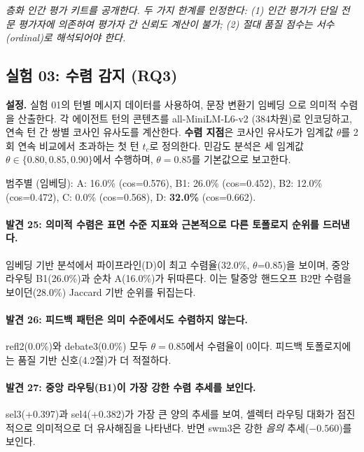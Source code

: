 \documentclass[a4paper,11pt]{article}
\begin{document}
\emph{층화 인간 평가 키트를 공개한다. 두 가지 한계를 인정한다: (1) 인간 평가가 단일 전문 평가자에 의존하여 평가자 간 신뢰도 계산이 불가; (2) 절대 품질 점수는 서수(ordinal)로 해석되어야 한다.}

\subsection{실험 03: 수렴 감지 (RQ3)}
\label{sec:exp03}

\textbf{설정.} 실험 01의 턴별 메시지 데이터를 사용하여, 문장 변환기 임베딩 \citep{reimers2019sentence}으로 의미적 수렴을 산출한다. 각 에이전트 턴의 콘텐츠를 all-MiniLM-L6-v2 (384차원)로 인코딩하고, 연속 턴 간 쌍별 코사인 유사도를 계산한다. \textbf{수렴 지점}은 코사인 유사도가 임계값 $\theta$를 2회 연속 비교에서 초과하는 첫 턴 $t_c$로 정의한다. 민감도 분석은 세 임계값 $\theta \in \{0.80, 0.85, 0.90\}$에서 수행하며, $\theta=0.85$를 기본값으로 보고한다.


범주별 (임베딩): A: 16.0\% (cos=0.576), B1: 26.0\% (cos=0.452), B2: 12.0\% (cos=0.472), C: 0.0\% (cos=0.568), D: \textbf{32.0\%} (cos=0.662).



\paragraph{발견 25: 의미적 수렴은 표면 수준 지표와 근본적으로 다른 토폴로지 순위를 드러낸다.}
임베딩 기반 분석에서 파이프라인(D)이 최고 수렴율(32.0\%, $\theta$=0.85)을 보이며, 중앙 라우팅 B1(26.0\%)과 순차 A(16.0\%)가 뒤따른다. 이는 탈중앙 핸드오프 B2만 수렴을 보이던(28.0\%) Jaccard 기반 순위를 뒤집는다.

\paragraph{발견 26: 피드백 패턴은 의미 수준에서도 수렴하지 않는다.}
refl2(0.0\%)와 debate3(0.0\%) 모두 $\theta=0.85$에서 수렴율이 0이다. 피드백 토폴로지에는 품질 기반 신호(4.2절)가 더 적절하다.

\paragraph{발견 27: 중앙 라우팅(B1)이 가장 강한 수렴 추세를 보인다.}
sel3(+0.397)과 sel4(+0.382)가 가장 큰 양의 추세를 보여, 셀렉터 라우팅 대화가 점진적으로 의미적으로 더 유사해짐을 나타낸다. 반면 swm3은 강한 \emph{음의} 추세($-0.560$)를 보인다.
\end{document}
